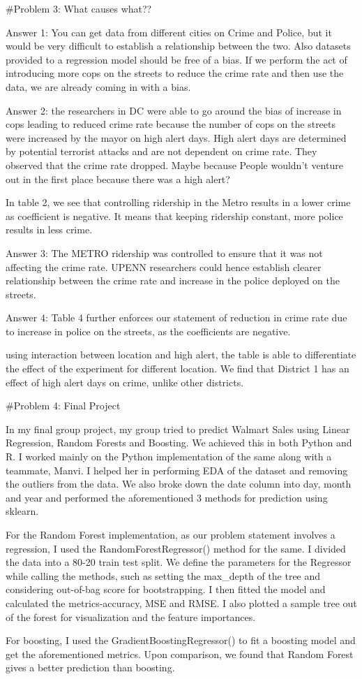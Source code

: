 \documentclass[
]{article}
\begin{document}
\#Problem 3: What causes what??

Answer 1: You can get data from different cities on Crime and Police,
but it would be very difficult to establish a relationship between the
two. Also datasets provided to a regression model should be free of a
bias. If we perform the act of introducing more cops on the streets to
reduce the crime rate and then use the data, we are already coming in
with a bias.

Answer 2: the researchers in DC were able to go around the bias of
increase in cops leading to reduced crime rate because the number of
cops on the streets were increased by the mayor on high alert days. High
alert days are determined by potential terrorist attacks and are not
dependent on crime rate. They observed that the crime rate dropped.
Maybe because People wouldn't venture out in the first place because
there was a high alert?

In table 2, we see that controlling ridership in the Metro results in a
lower crime as coefficient is negative. It means that keeping ridership
constant, more police results in less crime.

Answer 3: The METRO ridership was controlled to ensure that it was not
affecting the crime rate. UPENN researchers could hence establish
clearer relationship between the crime rate and increase in the police
deployed on the streets.

Answer 4: Table 4 further enforces our statement of reduction in crime
rate due to increase in police on the streets, as the coefficients are
negative.

using interaction between location and high alert, the table is able to
differentiate the effect of the experiment for different location. We
find that District 1 has an effect of high alert days on crime, unlike
other districts.

\#Problem 4: Final Project

In my final group project, my group tried to predict Walmart Sales using
Linear Regression, Random Forests and Boosting. We achieved this in both
Python and R. I worked mainly on the Python implementation of the same
along with a teammate, Manvi. I helped her in performing EDA of the
dataset and removing the outliers from the data. We also broke down the
date column into day, month and year and performed the aforementioned 3
methods for prediction using sklearn.

For the Random Forest implementation, as our problem statement involves
a regression, I used the RandomForestRegressor() method for the same. I
divided the data into a 80-20 train test split. We define the parameters
for the Regressor while calling the methods, such as setting the
max\_depth of the tree and considering out-of-bag score for
bootstrapping. I then fitted the model and calculated the
metrics-accuracy, MSE and RMSE. I also plotted a sample tree out of the
forest for visualization and the feature importances.

For boosting, I used the GradientBoostingRegressor() to fit a boosting
model and get the aforementioned metrics. Upon comparison, we found that
Random Forest gives a better prediction than boosting.
\end{document}
